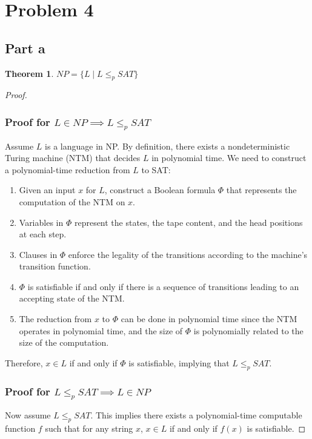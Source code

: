 \documentclass[a4paper,10pt]{article}
\newtheorem{theorem}{Theorem}
\begin{document}
\pagebreak
\section{Problem 4}
\subsection{Part a}
\begin{theorem}
    \( NP = \{ L \mid L \leq_p SAT \} \)
\end{theorem}
\begin{proof}
    

\subsubsection*{Proof for \( L \in NP \implies L \leq_p SAT \)}
Assume \( L \) is a language in NP. By definition, there exists a nondeterministic Turing machine (NTM) that decides \( L \) in polynomial time. We need to construct a polynomial-time reduction from \( L \) to SAT:

\begin{enumerate}
    \item Given an input \( x \) for \( L \), construct a Boolean formula \( \Phi \) that represents the computation of the NTM on \( x \).
    \item Variables in \( \Phi \) represent the states, the tape content, and the head positions at each step.
    \item Clauses in \( \Phi \) enforce the legality of the transitions according to the machine's transition function.
    \item \( \Phi \) is satisfiable if and only if there is a sequence of transitions leading to an accepting state of the NTM.
    \item The reduction from \( x \) to \( \Phi \) can be done in polynomial time since the NTM operates in polynomial time, and the size of \( \Phi \) is polynomially related to the size of the computation.
\end{enumerate}

Therefore, \( x \in L \) if and only if \( \Phi \) is satisfiable, implying that \( L \leq_p SAT \).

\subsubsection*{Proof for \( L \leq_p SAT \implies L \in NP \)}
Now assume \( L \leq_p SAT \). This implies there exists a polynomial-time computable function \( f \) such that for any string \( x \), \( x \in L \) if and only if \( f(x) \) is satisfiable.


\end{proof}
\end{document}
